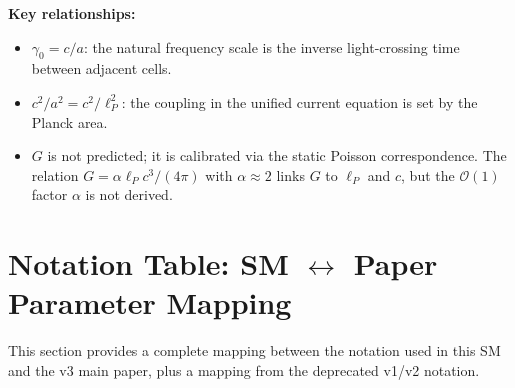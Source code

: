 \documentclass[reprint]{revtex4-2}
\begin{document}
\textbf{Key relationships:}
\begin{itemize}
\item $\gamma_0 = c/a$: the natural frequency scale is the inverse light-crossing time between adjacent cells.
\item $c^2/a^2 = c^2/\ell_P^2$: the coupling in the unified current equation is set by the Planck area.
\item $G$ is not predicted; it is calibrated via the static Poisson correspondence. The relation $G = \alpha\ell_P c^3/(4\pi)$ with $\alpha \approx 2$ links $G$ to $\ell_P$ and $c$, but the $\mathcal{O}(1)$ factor $\alpha$ is not derived.
\end{itemize}

\section{Notation Table: SM $\leftrightarrow$ Paper Parameter Mapping}

This section provides a complete mapping between the notation used in this SM and the v3 main paper, plus a mapping from the deprecated v1/v2 notation.
\end{document}
